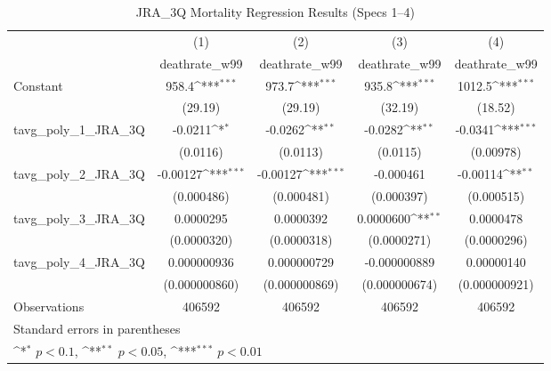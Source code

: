 \begin{table}[htbp]\centering
\def\sym#1{\ifmmode^{#1}\else\(^{#1}\)\fi}
\caption{JRA\_3Q Mortality Regression Results (Specs 1–4)}
\begin{tabular}{l*{4}{c}}
\hline\hline
                    &\multicolumn{1}{c}{(1)}&\multicolumn{1}{c}{(2)}&\multicolumn{1}{c}{(3)}&\multicolumn{1}{c}{(4)}\\
                    &\multicolumn{1}{c}{deathrate\_w99}&\multicolumn{1}{c}{deathrate\_w99}&\multicolumn{1}{c}{deathrate\_w99}&\multicolumn{1}{c}{deathrate\_w99}\\
\hline
Constant            &       958.4\sym{***}&       973.7\sym{***}&       935.8\sym{***}&      1012.5\sym{***}\\
                    &     (29.19)         &     (29.19)         &     (32.19)         &     (18.52)         \\
[1em]
tavg\_poly\_1\_JRA\_3Q  &     -0.0211\sym{*}  &     -0.0262\sym{**} &     -0.0282\sym{**} &     -0.0341\sym{***}\\
                    &    (0.0116)         &    (0.0113)         &    (0.0115)         &   (0.00978)         \\
[1em]
tavg\_poly\_2\_JRA\_3Q  &    -0.00127\sym{***}&    -0.00127\sym{***}&   -0.000461         &    -0.00114\sym{**} \\
                    &  (0.000486)         &  (0.000481)         &  (0.000397)         &  (0.000515)         \\
[1em]
tavg\_poly\_3\_JRA\_3Q  &   0.0000295         &   0.0000392         &   0.0000600\sym{**} &   0.0000478         \\
                    & (0.0000320)         & (0.0000318)         & (0.0000271)         & (0.0000296)         \\
[1em]
tavg\_poly\_4\_JRA\_3Q  & 0.000000936         & 0.000000729         &-0.000000889         &  0.00000140         \\
                    &(0.000000860)         &(0.000000869)         &(0.000000674)         &(0.000000921)         \\
\hline
Observations        &      406592         &      406592         &      406592         &      406592         \\
\hline\hline
\multicolumn{5}{l}{\footnotesize Standard errors in parentheses}\\
\multicolumn{5}{l}{\footnotesize \sym{*} \(p<0.1\), \sym{**} \(p<0.05\), \sym{***} \(p<0.01\)}\\
\end{tabular}
\end{table}
